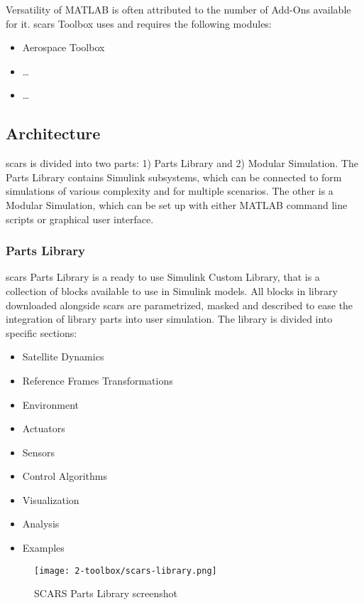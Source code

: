     Versatility of MATLAB is often attributed to the number of Add-Ons available for it. \ac{scars} Toolbox uses and requires the following modules:
    \begin{itemize}
        \item Aerospace Toolbox
        \item \dots
        \item \dots
    \end{itemize}
    

\subsection{Architecture}
    \ac{scars} is divided into two parts: 1) Parts Library and 2) Modular Simulation. The Parts Library contains Simulink subsystems, which can be connected to form simulations of various complexity and for multiple scenarios. The other is a Modular Simulation, which can be set up with either MATLAB command line scripts or graphical user interface.

    \subsubsection{Parts Library}
        \ac{scars} Parts Library is a ready to use Simulink Custom Library, that is a collection of blocks available to use in Simulink models. All blocks in library downloaded alongside \ac{scars} are parametrized, masked and described to ease the integration of library parts into user simulation. The library is divided into specific sections:
        \begin{itemize}
            \item Satellite Dynamics
            \item Reference Frames Transformations
            \item Environment
            \item Actuators
            \item Sensors
            \item Control Algorithms
            \item Visualization
            \item Analysis
            \item Examples
        \end{itemize}

        \begin{figure}[H]
            \centering
            \texttt{[image: 2-toolbox/scars-library.png]}
            \caption{SCARS Parts Library screenshot}
            \label{fig:scars-library}
        \end{figure}

